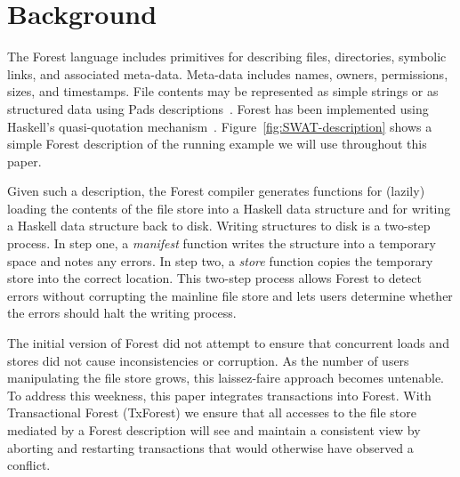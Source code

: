 \section{Background}
\label{sec:Background}


The Forest language includes primitives for describing files,
directories, symbolic links, and associated meta-data.  Meta-data
includes names, owners, permissions, sizes, and timestamps.  File
contents may be represented as simple strings or as structured data
using Pads descriptions~\cite{fisher+:pads,fisher-walker:icdt}. Forest has been implemented using
Haskell's quasi-quotation mechanism~\cite{Mainland:quasi}.
Figure~\ref{fig:SWAT-description} shows a simple Forest
description of the running example we will use throughout this paper.

Given such a description, the Forest compiler generates functions for
(lazily) loading the contents of the file store into a Haskell data
structure and for writing a Haskell data structure back to disk.
Writing structures to disk is a two-step process.  In step one, a
\textit{manifest} function writes the structure into a temporary space
and notes any errors.  In step two, a \textit{store} function copies
the temporary store into the correct location.  This two-step process
allows Forest to detect errors without corrupting the mainline
file store and lets users determine whether the errors should halt the
writing process.

The initial version of Forest did not attempt to ensure that 
concurrent loads and stores did not cause inconsistencies or
corruption.  As the number of users manipulating the file store grows,
this laissez-faire approach becomes untenable.  To address this
weekness, this paper integrates transactions into Forest.  With
Transactional Forest (TxForest) we ensure that all accesses to the
file store mediated by a Forest description will see and maintain a
consistent view by aborting and restarting transactions that would
otherwise have observed a conflict.

